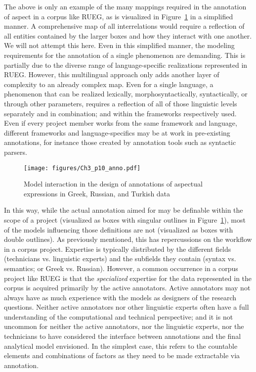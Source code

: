 \documentclass[output=paper,colorlinks,citecolor=brown]{langscibook}
\begin{document}
The above is only an example of the many mappings required in the annotation of aspect in a corpus like RUEG, as is visualized in Figure~\ref{fig:shadrovaetal:p10_anno} in a simplified manner. A comprehensive map of all interrelations would require a reflection of all entities contained by the larger boxes and how they interact with one another. We will not attempt this here. Even in this simplified manner, the modeling requirements for the annotation of a single phenomenon are demanding. This is partially due to the diverse range of language-specific realizations represented in RUEG. However, this multilingual approach only adds another layer of complexity to an already complex map. Even for a single language, a phenomenon that can be realized lexically, morphosyntactically, syntactically, or through other parameters, requires a reflection of all of those linguistic levels separately and in combination; and within the frameworks respectively used. Even if every project member works from the same framework and language, different frameworks and language-specifics may be at work in pre-existing annotations, for instance those created by annotation tools such as syntactic parsers. 

\begin{figure}[h]
    \texttt{[image: figures/Ch3\_p10\_anno.pdf]}
    \caption{Model interaction in the design of annotations of aspectual expressions in Greek, Russian, and Turkish data}
    \label{fig:shadrovaetal:p10_anno}
\end{figure}

In this way, while the actual annotation aimed for may be definable within the scope of a project (visualized as boxes with singular outlines in Figure~\ref{fig:shadrovaetal:p10_anno}), most of the models influencing those definitions are not (visualized as boxes with double outlines). As previously mentioned, this has repercussions on the workflow in a corpus project. Expertise is typically distributed by the different fields (technicians vs. linguistic experts) and the subfields they contain (syntax vs. semantics; or Greek vs. Russian). However, a common occurrence in a corpus project like RUEG is that the \textit{specialized} expertise for the data represented in the corpus is acquired primarily by the active annotators. Active annotators may not always have as much experience with the models as designers of the research questions. Neither active annotators nor other linguistic experts often have a full understanding of the computational and technical perspective; and it is not uncommon for neither the active annotators, nor the linguistic experts, nor the technicians to have considered the interface between annotations and the final analytical model envisioned. In the simplest case, this refers to the countable elements and combinations of factors as they need to be made extractable via annotation.
\end{document}
